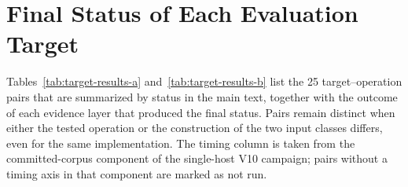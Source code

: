 \section{Final Status of Each Evaluation Target}
\label{app:target-results}

Tables~\ref{tab:target-results-a} and~\ref{tab:target-results-b} list the 25 target--operation pairs that are summarized by status in the main text, together with the outcome of each evidence layer that produced the final status. Pairs remain distinct when either the tested operation or the construction of the two input classes differs, even for the same implementation. The timing column is taken from the committed-corpus component of the single-host V10 campaign; pairs without a timing axis in that component are marked as not run.

